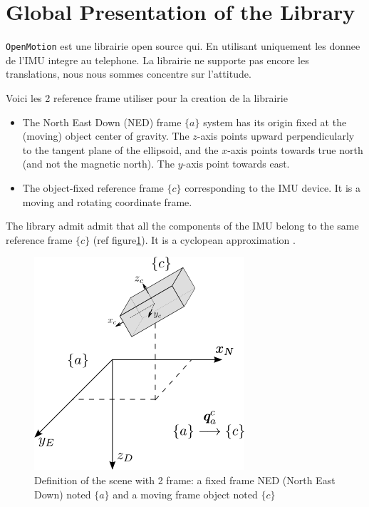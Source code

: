 
\section{Global Presentation of the Library}

\texttt{OpenMotion} est une librairie open source qui. En utilisant uniquement les donnee de l'IMU integre au telephone. La librairie ne supporte pas encore les translations, nous nous sommes concentre sur l'attitude. 


Voici les 2 reference frame utiliser pour la creation de la librairie

\vspace{0.1cm}

\begin{itemize}
\item The North East Down (NED) frame $\{a\}$ system has its origin fixed at the (moving) object center of gravity. The $z$-axis points upward perpendicularly to the tangent plane of the ellipsoid, and the $x$-axis points towards true north (and not the magnetic north). The $y$-axis point towards east.

\vspace{0.1cm}

\item The object-fixed reference frame $\{c\}$ corresponding to the IMU device. It is a moving and rotating coordinate frame. 
\end{itemize}

\vspace{0.1cm}

The library admit admit that all the components of the IMU belong to the same reference frame $\{c\}$ (ref figure\ref{Schema_situation}). It is a cyclopean approximation \cite{ouarti2008multimodal} .

\begin{figure}
\centering
\includegraphics[scale=0.65]{images/Schema_situation.png}
\caption{Definition of the scene with 2 frame:  a fixed frame NED (North East Down) noted $\{a\}$ and a moving frame object noted $\{c\}$}
\label{Schema_situation}
\end{figure}



